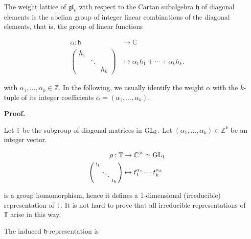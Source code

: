\documentclass[10pt,a4paper]{article}
\begin{document}
The weight lattice of $\mathfrak{gl}_{k}$ with respect to the Cartan subalgebra $\mathfrak{h}$ of diagonal elements is the abelian group of integer linear combinations of the diagonal elements, that is, the group of linear functions



\[\begin{aligned}
\displaystyle\alpha:\mathfrak{h} & \displaystyle\to\mathbb{C} \\
\displaystyle\left(\begin{smallmatrix}h_{1}&&\\ &\ddots&\\ &&h_{k}\end{smallmatrix}\right) & \displaystyle\mapsto\alpha_{1}h_{1}+\cdots+\alpha_{k}h_{k}.
\end{aligned}\]


with $\alpha_{1},\ldots,\alpha_{k}\in\mathbb{Z}$. In the following, we usually identify the weight $\alpha$ with the $k$-tuple of its integer coefficients $\alpha=(\alpha_{1},\ldots,\alpha_{k})$.






\par\medskip\noindent\textbf{Proof.}\par




Let $\mathbb{T}$ be the subgroup of diagonal matrices in $\textnormal{GL}_{k}$. Let $(\alpha_{1},\ldots,\alpha_{k})\in\mathbb{Z}^{k}$ be an integer vector.



\[\begin{aligned}
\displaystyle\rho:\mathbb{T} & \displaystyle\to\mathbb{C}^{\times}\simeq\textnormal{GL}_{1} \\
\displaystyle\left(\begin{smallmatrix}t_{1}&&\\ &\ddots&\\ &&t_{k}\end{smallmatrix}\right) & \displaystyle\mapsto t_{1}^{\alpha_{1}}\cdots t_{k}^{\alpha_{k}}
\end{aligned}\]


is a group homomorphism, hence it defines a $1$-dimensional (irreducible) representation of $\mathbb{T}$. It is not hard to prove that all irreducible representations of $\mathbb{T}$ arise in this way.





The induced $\mathfrak{h}$-representation is
\end{document}
